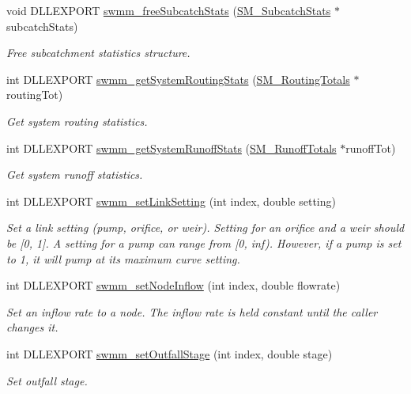 \begin{DoxyCompactItemize}
void D\+L\+L\+E\+X\+P\+O\+RT \hyperlink{group__tkfuncs_gaf24dfaf8bcd92298782f2449aa18a2f5}{swmm\+\_\+free\+Subcatch\+Stats} (\hyperlink{struct_s_m___subcatch_stats}{S\+M\+\_\+\+Subcatch\+Stats} $\ast$subcatch\+Stats)
\begin{DoxyCompactList}\small\item\em Free subcatchment statistics structure. \end{DoxyCompactList}\item 
int D\+L\+L\+E\+X\+P\+O\+RT \hyperlink{group__tkfuncs_ga8e4dcd4d9243ac428633e7cdabf0712a}{swmm\+\_\+get\+System\+Routing\+Stats} (\hyperlink{struct_s_m___routing_totals}{S\+M\+\_\+\+Routing\+Totals} $\ast$routing\+Tot)
\begin{DoxyCompactList}\small\item\em Get system routing statistics. \end{DoxyCompactList}\item 
int D\+L\+L\+E\+X\+P\+O\+RT \hyperlink{group__tkfuncs_gabf3ea290e2af763289e18db435ea2ccd}{swmm\+\_\+get\+System\+Runoff\+Stats} (\hyperlink{struct_s_m___runoff_totals}{S\+M\+\_\+\+Runoff\+Totals} $\ast$runoff\+Tot)
\begin{DoxyCompactList}\small\item\em Get system runoff statistics. \end{DoxyCompactList}\item 
int D\+L\+L\+E\+X\+P\+O\+RT \hyperlink{group__tkfuncs_gab44d2b1c21a6f750b0ce4c48ba16be81}{swmm\+\_\+set\+Link\+Setting} (int index, double setting)
\begin{DoxyCompactList}\small\item\em Set a link setting (pump, orifice, or weir). Setting for an orifice and a weir should be \mbox{[}0, 1\mbox{]}. A setting for a pump can range from \mbox{[}0, inf). However, if a pump is set to 1, it will pump at its maximum curve setting. \end{DoxyCompactList}\item 
int D\+L\+L\+E\+X\+P\+O\+RT \hyperlink{group__tkfuncs_ga6438a8a45d7712b8b02ba630cd8e1db3}{swmm\+\_\+set\+Node\+Inflow} (int index, double flowrate)
\begin{DoxyCompactList}\small\item\em Set an inflow rate to a node. The inflow rate is held constant until the caller changes it. \end{DoxyCompactList}\item 
int D\+L\+L\+E\+X\+P\+O\+RT \hyperlink{group__tkfuncs_ga80d902400625073d8ff2c392365fde9b}{swmm\+\_\+set\+Outfall\+Stage} (int index, double stage)
\begin{DoxyCompactList}\small\item\em Set outfall stage. \end{DoxyCompactList}\end{DoxyCompactItemize}


